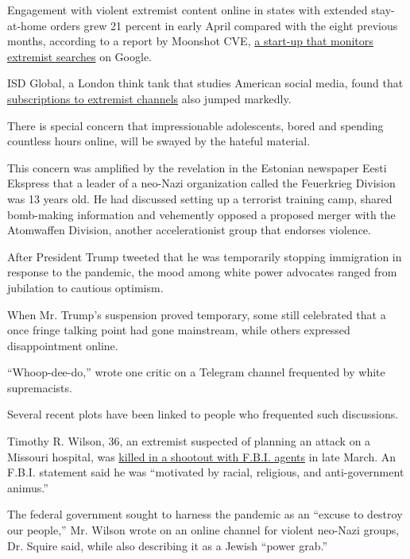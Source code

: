 Engagement with violent extremist content online in states with extended
stay-at-home orders grew 21 percent in early April compared with the
eight previous months, according to a report by Moonshot CVE,
\href{https://www.nytimes3xbfgragh.onion/2019/12/30/us/white-supremacy-moonshot-google-ads.html}{a
start-up that monitors extremist searches} on Google.

ISD Global, a London think tank that studies American social media,
found that
\href{https://www.isdglobal.org/isd-publications/covid-19-disinformation-briefing-no-2/}{subscriptions
to extremist channels} also jumped markedly.

There is special concern that impressionable adolescents, bored and
spending countless hours online, will be swayed by the hateful material.

This concern was amplified by the revelation in the Estonian newspaper
Eesti Ekspress that a leader of a neo-Nazi organization called the
Feuerkrieg Division was 13 years old. He had discussed setting up a
terrorist training camp, shared bomb-making information and vehemently
opposed a proposed merger with the Atomwaffen Division, another
accelerationist group that endorses violence.

After President Trump tweeted that he was temporarily stopping
immigration in response to the pandemic, the mood among white power
advocates ranged from jubilation to cautious optimism.

When Mr. Trump's suspension proved temporary, some still celebrated that
a once fringe talking point had gone mainstream, while others expressed
disappointment online.

``Whoop-dee-do,'' wrote one critic on a Telegram channel frequented by
white supremacists.

Several recent plots have been linked to people who frequented such
discussions.

Timothy R. Wilson, 36, an extremist suspected of planning an attack on a
Missouri hospital, was
\href{https://www.nytimes3xbfgragh.onion/2020/03/25/us/politics/coronavirus-fbi-shooting.html}{killed
in a shootout with F.B.I. agents} in late March. An F.B.I. statement
said he was ``motivated by racial, religious, and anti-government
animus.''

The federal government sought to harness the pandemic as an ``excuse to
destroy our people,'' Mr. Wilson wrote on an online channel for violent
neo-Nazi groups, Dr. Squire said, while also describing it as a Jewish
``power grab.''

